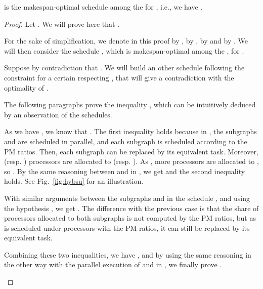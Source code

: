\documentclass{llncs}
\newcommand{\newparskip}{\bigskip}
\begin{document}
\begin{lemma}
\label{lem:uopt}
 is the makespan-optimal schedule among the  for , i.e., we have .

\end{lemma}



\begin{proof}
Let . We will prove here that .

For the sake of simplification, we denote in this proof  by ,  by ,  by  and  by . We will then consider the schedule , which is makespan-optimal among the , for .

Suppose by contradiction that . We will build an other schedule  following the constraint  for a certain  respecting , that will give a contradiction with the optimality of . 

\newparskip

The following paragraphs prove the inequality , which can be intuitively deduced by an observation of the schedules.

As we have , we know that . The first inequality holds because in , the subgraphs  and  are scheduled in parallel, and each subgraph is scheduled according to the PM ratios. Then, each subgraph {\color{red} can be replaced by its equivalent task}.   Moreover,  (resp. ) processors are allocated to   (resp. ). As , more processors are allocated to , so . 
By the same reasoning between  and  in , we get  and the second inequality holds. See Fig.~\ref{fig:hybsu} for an illustration.

With similar arguments between the subgraphs  and  in the schedule , and using the hypothesis , we get . The difference with the previous case is that the share of processors allocated to both subgraphs is not computed by the PM ratios, but as  is scheduled under  processors with the PM ratios, {\color{red} it can still be replaced by its equivalent task}.

Combining these two inequalities, we have , and by using the same reasoning in the other way with the parallel execution of  and  in , we finally prove .

\begin{figure}[!ht]
\centering
\newcommand{\midy}{60pt}
\newcommand{\topy}{90pt}
\newcommand{\midx}{60pt}
\newcommand{\midlx}{30pt}
\newcommand{\topx}{91pt}

\newcommand{\bota}{70pt}
\newcommand{\leftb}{75pt}
\newcommand{\scalerat}{0.8}
{\begin{tikzpicture}[scale =\scalerat,
every node/.style={inner sep=0pt, minimum size=0pt, anchor=center, transform shape},
label/.style={}
]


\end{tikzpicture}}
\end{figure}
\end{proof}
\end{document}
